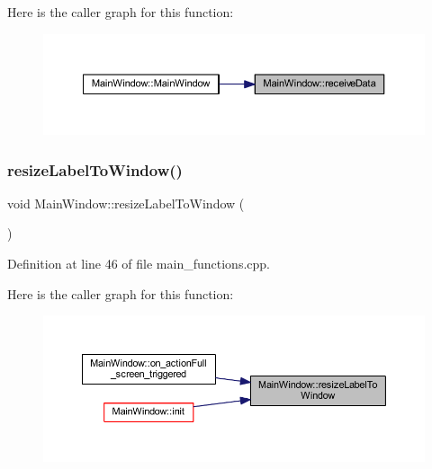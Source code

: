Here is the caller graph for this function\+:
\nopagebreak
\begin{figure}[H]
\begin{center}
\leavevmode
\includegraphics[width=350pt]{classMainWindow_ac7fa2374f28a46ed205758559114d79f_icgraph}
\end{center}
\end{figure}
\mbox{\label{classMainWindow_a5e7a591198f61ccccbd9608a519dcd01}} 
\subsubsection{\texorpdfstring{resizeLabelToWindow()}{resizeLabelToWindow()}}
{\footnotesize\ttfamily void Main\+Window\+::resize\+Label\+To\+Window (\begin{DoxyParamCaption}{ }\end{DoxyParamCaption})\hspace{0.3cm}{\ttfamily [private]}}



Definition at line 46 of file main\+\_\+functions.\+cpp.

Here is the caller graph for this function\+:
\nopagebreak
\begin{figure}[H]
\begin{center}
\leavevmode
\includegraphics[width=350pt]{classMainWindow_a5e7a591198f61ccccbd9608a519dcd01_icgraph}
\end{center}
\end{figure}
\mbox{\label{classMainWindow_abf8d2aa0872c2072510bc93f9f9e4d11}} 
